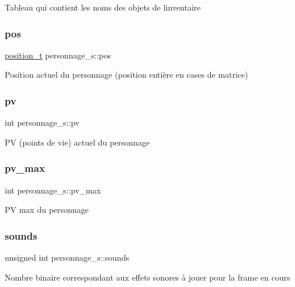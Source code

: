 Tableau qui contient les noms des objets de l\textquotesingle{}inventaire \mbox{\label{structpersonnage__s_adea4789f8b55587ec092f3a32b7b1964}} 
\subsubsection{\texorpdfstring{pos}{pos}}
{\footnotesize\ttfamily \hyperlink{structposition__s}{position\+\_\+t} personnage\+\_\+s\+::pos}

Position actuel du personnage (position entière en cases de matrice) \mbox{\label{structpersonnage__s_ab3090d9110756af454516f939e9f8a86}} 
\subsubsection{\texorpdfstring{pv}{pv}}
{\footnotesize\ttfamily int personnage\+\_\+s\+::pv}

PV (points de vie) actuel du personnage \mbox{\label{structpersonnage__s_a0e58c8761de9044ce770f21aa9ada41a}} 
\subsubsection{\texorpdfstring{pv\+\_\+max}{pv\_max}}
{\footnotesize\ttfamily int personnage\+\_\+s\+::pv\+\_\+max}

PV max du personnage \mbox{\label{structpersonnage__s_ae3e2c166abcaaadff66047abb2594e05}} 
\subsubsection{\texorpdfstring{sounds}{sounds}}
{\footnotesize\ttfamily unsigned int personnage\+\_\+s\+::sounds}

Nombre binaire correspondant aux effets sonores à jouer pour la frame en cours \mbox{\label{structpersonnage__s_afa75822afebdaf61725b7f87c86d5922}} 
